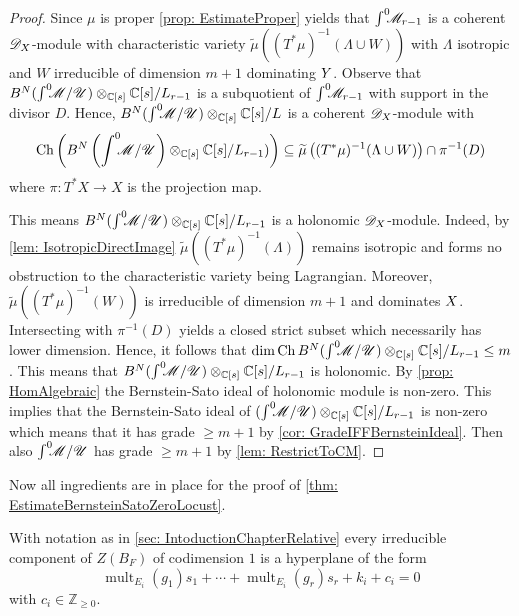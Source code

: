\begin{proof}
  Since $\mu$ is proper \cref{prop: EstimateProper} yields that $\int^0 \mkern -8mu \mathscr{M}_{r-1}$ is a coherent $\mathscr{D}_X$-module with characteristic variety $\widetilde{\mu}((T^*\mu)^{-1}(\Lambda\cup W))$ with $\Lambda$ isotropic and $W$ irreducible of dimension $m+1$ dominating $Y$.
  Observe that $B^N(\int^0 \mkern -8mu\mathscr{M}/ \mathscr{U})\otimes_{\mathbb{C}[s]}\mathbb{C}[s]/L_{r-1}$ is a subquotient of $\int^0 \mkern -8mu\mathscr{M}_{r-1}$ with support in the divisor $D$.
  Hence, $B^N(\int^0 \mkern -8mu\mathscr{M}/ \mathscr{U})\otimes_{\mathbb{C}[s]}\mathbb{C}[s]/L$ is a coherent $\mathscr{D}_X$-module with
  $$\operatorname{Ch}\left( B^N\left(\int^0 \mkern -8mu\mathscr{M}/ \mathscr{U}\right)\otimes_{\mathbb{C}[s]}\mathbb{C}[s]/L_{r-1}) \right)\subseteq  \widetilde{\mu}\left((T^*\mu)^{-1}(\Lambda\cup W)\right) \cap \pi^{-1}(D)$$
  where $\pi:T^*X\to X$ is the projection map.

  This means $B^N(\int^0 \mkern -8mu\mathscr{M}/ \mathscr{U})\otimes_{\mathbb{C}[s]}\mathbb{C}[s]/L_{r-1}$ is a holonomic $\mathscr{D}_X$-module.
  Indeed, by \cref{lem: IsotropicDirectImage} $\widetilde{\mu}((T^*\mu)^{-1}(\Lambda))$ remains isotropic and forms no obstruction to the characteristic variety being Lagrangian.
  Moreover, $\widetilde{\mu}((T^*\mu)^{-1}(W))$ is irreducible of dimension $m+1$ and dominates $X$.
  Intersecting with $\pi^{-1}(D)$ yields a closed strict subset which necessarily has lower dimension.
  Hence, it follows that $\dim \operatorname{Ch} B^N (\int^0 \mkern -8mu\mathscr{M}/ \mathscr{U})\otimes_{\mathbb{C}[s]}\mathbb{C}[s]/L_{r-1} \leq m$.
  This means that $B^N(\int^0 \mkern -8mu\mathscr{M}/ \mathscr{U})\otimes_{\mathbb{C}[s]}\mathbb{C}[s]/L_{r-1}$ is holonomic.
  By \cref{prop: HomAlgebraic} the Bernstein-Sato ideal of holonomic module is non-zero.
  This implies that the Bernstein-Sato ideal of $(\int^0 \mkern -8mu\mathscr{M}/ \mathscr{U})\otimes_{\mathbb{C}[s]}\mathbb{C}[s]/L_{r-1}$ is non-zero which means that it has grade $\geq m+1$ by \cref{cor: GradeIFFBernsteinIdeal}.
  Then also $\int^0 \mkern -8mu\mathscr{M}/\mathscr{U}$ has grade $\geq m+1$ by \cref{lem: RestrictToCM}.
  \end{proof}
Now all ingredients are in place for the proof of \cref{thm: EstimateBernsteinSatoZeroLocust}.
\begin{theorem}
  With notation as in \cref{sec: IntoductionChapterRelative} every irreducible component of $Z(B_F)$ of codimension $1$ is a hyperplane of the form
  $$\operatorname{mult}_{E_i}(g_1) s_1 + \cdots + \operatorname{mult}_{E_i}(g_r)s_r + k_i + c_i=0$$
  with $c_i \in \mathbb{Z}_{\geq 0 }$.
\end{theorem}

